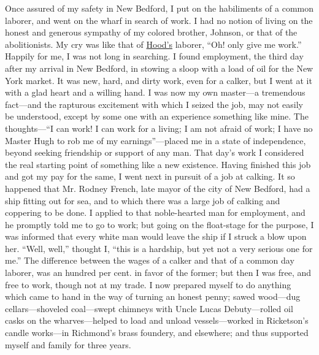 Once assured of my safety in New Bedford, I put on the habiliments of a
common laborer, and went on the wharf in search of work. I had no notion
of living on the honest and generous sympathy of my colored brother,
Johnson, or that of the abolitionists. My cry was like that of
\href{/wiki/Author:Thomas_Hood}{Hood's} laborer, ``Oh! only give me
work.'' Happily for me, I was not long in searching. I found employment,
the third day after my arrival in New Bedford, in stowing a sloop with a
load of oil for the New York market. It was new, hard, and dirty work,
even for a calker, but I went {}at it with a glad heart and a willing
hand. I was now my own master---a tremendous fact---and the rapturous
excitement with which I seized the job, may not easily be understood,
except by some one with an experience something like mine. The
thoughts---``I can work! I can work for a living; I am not afraid of
work; I have no Master Hugh to rob me of my earnings''---placed me in a
state of independence, beyond seeking friendship or support of any man.
That day's work I considered the real starting point of something like a
new existence. Having finished this job and got my pay for the same, I
went next in pursuit of a job at calking. It so happened that Mr. Rodney
French, late mayor of the city of New Bedford, had a ship fitting out
for sea, and to which there was a large job of calking and coppering to
be done. I applied to that noble-hearted man for employment, and he
promptly told me to go to work; but going on the float-stage for the
purpose, I was informed that every white man would leave the ship if I
struck a blow upon her. ``Well, well,'' thought I, ``this is a hardship,
but yet not a very serious one for me.'' The difference between the
wages of a calker and that of a common day laborer, was an hundred per
cent. in favor of the former; but then I was free, and free to work,
though not at my trade. I now prepared myself to do anything which came
to hand in the way of turning an honest penny; sawed wood---dug
cellars---shoveled coal---swept chimneys with Uncle Lucas
Debuty---rolled oil casks on the wharves---helped to load and unload
vessels---worked in Ricketson's candle {}works---in Richmond's brass
foundery, and elsewhere; and thus supported myself and family for three
years.

